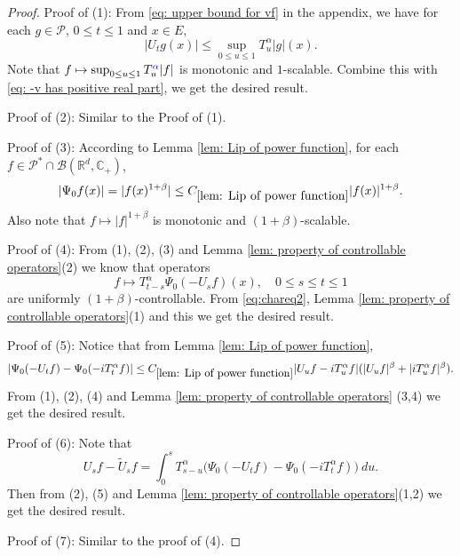 \documentclass[12pt,oneside,english]{amsart}
\theoremstyle{plain}
\theoremstyle{definition}
\numberwithin{equation}{section}
\newcommand{\added}[1]{{\color{blue}#1}}\newcommand{\deleted}[1]{{\color{red}#1}}
\begin{document}
\begin{proof}
    Proof of (1): From \eqref{eq: upper bound for vf} in the appendix, we have for each $g\in \mathcal P$, $0\leq t\leq 1$ and $x\in E$,
\[
    |U_t g(x)|
    \leq \sup_{0\leq u\leq 1}T_u^\alpha |g| (x).
\]
    Note that $f\mapsto\sup_{0\leq u\leq 1}T^{\added{\alpha}}_u|f|$ is monotonic and $1$-scalable. 
    \added{Combine this with \eqref{eq: -v has positive real part}, we get the desired result.}

    Proof of (2): Similar to the Proof of (1).

    Proof of (3): According to Lemma \ref{lem: Lip of power function}, for each $f\in \mathcal P^* \cap \mathcal B(\mathbb R^d, \mathbb C_+)$,
\[
    |\Psi_0 f(x)| = |f(x)^{1+\beta}| \leq C_{\ref{lem: Lip of power function}} |f(x)|^{1+\beta}.
\]
    Also note that $f\mapsto |f|^{1+\beta}$ is monotonic and $(1+\beta)$-scalable.

    Proof of (4): From (1), (2), (3) and Lemma \ref{lem: property of controllable operators}(2) we know that operators
\[
    f
    \mapsto T^{\alpha}_{t-s}\Psi_0(-U_sf)(x),
    \quad 0\leq s\leq t\leq 1
\]
    are uniformly $(1+\beta)$-controllable.
    From \added{\eqref{eq:chareq2},} Lemma \ref{lem: property of controllable operators}(1) and this we get the desired result.

    Proof of (5): Notice that from Lemma \ref{lem: Lip of power function},
\[
    |\Psi_0(-U_t f) - \Psi_0(-iT_t^\alpha f) |
    \leq  C_{\ref{lem: Lip of power function}} |U_u f-iT_u^{\alpha}f|(|U_u f|^{\beta}+|i T_u^{\alpha}f|^{\beta}).
\]
    From (1), (2), (4) and Lemma \ref{lem: property of controllable operators} (3,4) we get the desired result.

    Proof of (6): Note that
\[
    U_sf - \tilde U_sf
    = \int_0^s T_{s-u}^{\alpha}\big(\Psi_0(-U_t f)-\Psi_0(-i T_t^{\alpha}f)\big)~du.
\]
    Then from (2), (5) and Lemma \ref{lem: property of controllable operators}(1,2) we get the desired result.

    Proof of (7): Similar to the proof of (4).
\end{proof}
\end{document}
